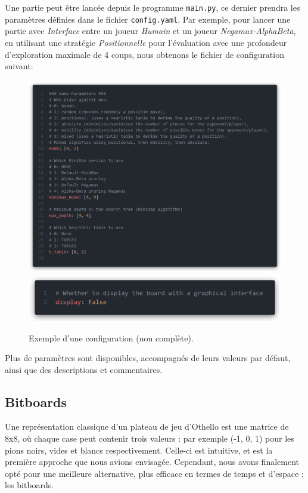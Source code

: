Une partie peut être lancée depuis le programme \texttt{main.py}, ce dernier prendra les paramètres définies dans le fichier \texttt{config.yaml}. Par exemple, pour lancer une partie avec \textit{Interface} entre un joueur \textit{Humain} et un joueur \textit{Negamax-AlphaBeta}, en utilisant une stratégie \textit{Positionnelle} pour l'évaluation avec une profondeur d'exploration maximale de 4 coups, nous obtenons le fichier de configuration suivant: 
\begin{figure}[H]
    \centering
    \includegraphics[width=\textwidth]{ressources/configYaml.png}
    \includegraphics[width=\textwidth]{ressources/configYaml-display.png}
    \caption{Exemple d'une configuration (non complète).}
    \label{fig:configYaml}
\end{figure}

Plus de paramètres sont disponibles, accompagnés de leurs valeurs par défaut, ainsi que des descriptions et commentaires.


\subsection{Bitboards}
\label{subsec:bit}
Une représentation classique d'un plateau de jeu d'Othello est une matrice de 8x8, où chaque case peut contenir trois valeurs : par exemple (-1, 0, 1) pour les pions noirs, vides et blancs respectivement. Celle-ci est intuitive, et est la première approche que nous avions envisagée. Cependant, nous avons finalement opté pour une meilleure alternative, plus efficace en termes de temps et d'espace : les bitboards.

